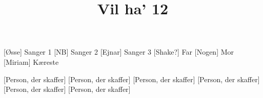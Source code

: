 \documentclass[a4paper,11pt]{article}
\title{Vil ha' 12}
\begin{document}
\maketitle

\begin{roles}
[Øsse] Sanger 1
[NB] Sanger 2
[Ejnar] Sanger 3
[Shake?] Far
[Nogen\texttrademark] Mor
[Miriam] Kæreste
\end{roles}

\begin{props}
[Person, der skaffer]
[Person, der skaffer]
[Person, der skaffer]
[Person, der skaffer]
[Person, der skaffer]
[Person, der skaffer]
\end{props}
\end{document}
